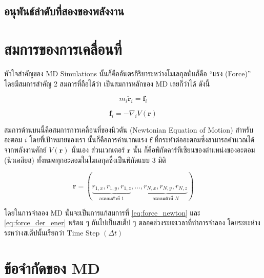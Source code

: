 \subsection{อนุพันธ์ลำดับที่สองของพลังงาน}


\section{สมการของการเคลื่อนที่}

หัวใจสำคัญของ MD Simulations นั้นก็คืออันตรกิริยาระหว่างโมเลกุลนั่นก็คือ \enquote{แรง (Force)} โดยมีสมการสำคัญ 2 สมการที่ถือได้ว่า%
เป็นสมการหลักของ MD เลยก็ว่าได้ ดังนี้

\begin{equation}
    \label{eq:force_newton}
    m_{i}\bm{\ddot{r}}_{i} = \bm{f}_{i}
\end{equation}

\begin{equation}
    \label{eq:force_der_ener}
    \bm{f}_{i} = -\nabla_{i}V(\bm{r})
\end{equation}

\noindent สมการด้านบนนี้คือสมการการเคลื่อนที่ของนิวตัน (Newtonian Equation of Motion) สำหรับอะตอม $i$ โดยที่เป้าหมายของเรา%
นั้นก็คือการคำนวณแรง $\bm{f}$ ที่กระทำต่ออะตอมซึ่งสามารถคำนวณได้จากพลังงานศักย์ $V(\bm{r})$ นั่นเอง ส่วนเวกเตอร์ $\bm{r}$ นั้น%
ก็คือพิกัดคาร์ทีเซียนของตำแหน่งของอะตอม (นิวเคลียส) ทั้งหมดทุกอะตอมในโมเลกุลซึ่งเป็นพิกัดแบบ 3 มิติ

\begin{equation}
    \bm{r} = (\underbrace{r_{1,x}, r_{1,y}, r_{1,z}}_{\text{อะตอมตัวที่ 1}}, \dots,
    \underbrace{r_{N,x}, r_{N,y}, r_{N,z}}_{\text{อะตอมตัวที่ $N$}})
\end{equation}

โดยในการจำลอง MD นั้นจะเป็นการแก้สมการที่ \eqref{eq:force_newton} และ \eqref{eq:force_der_ener} พร้อม ๆ กันไปเป็นสเต็ป ๆ
ตลอดช่วงระยะเวลาที่ทำการจำลอง โดยระยะห่างระหว่างสเต็ปนั้นเรียกว่า Time Step $(\Delta t)$

\section{ข้อจำกัดของ MD}

